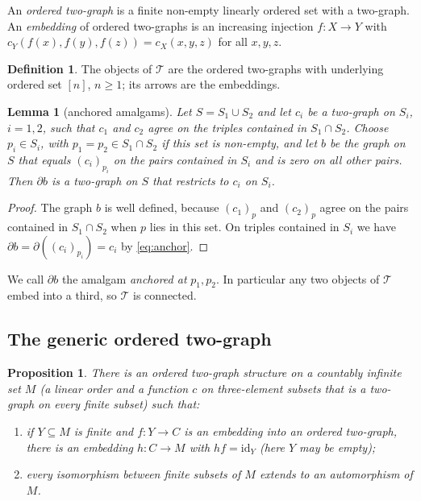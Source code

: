 \documentclass[11pt,a4paper]{article}
\newtheorem{proposition}[theorem]{Proposition}
\newtheorem{lemma}[theorem]{Lemma}
\theoremstyle{definition}
\newtheorem{definition}[theorem]{Definition}
\newcommand{\id}{\mathrm{id}}
\begin{document}
An \emph{ordered two-graph} is a finite non-empty linearly ordered set with a
two-graph. An \emph{embedding} of ordered two-graphs is an increasing
injection $f\colon X\to Y$ with $c_Y(f(x),f(y),f(z))=c_X(x,y,z)$ for all
$x,y,z$.

\begin{definition}
The objects of $\mathcal T$ are the ordered two-graphs with underlying ordered
set $[n]$, $n\ge1$; its arrows are the embeddings.
\end{definition}

\begin{lemma}[anchored amalgams]\label{lem:anchored}
Let $S=S_1\cup S_2$ and let $c_i$ be a two-graph on $S_i$, $i=1,2$, such that
$c_1$ and $c_2$ agree on the triples contained in $S_1\cap S_2$. Choose
$p_i\in S_i$, with $p_1=p_2\in S_1\cap S_2$ if this set is non-empty, and let
$b$ be the graph on $S$ that equals $(c_i)_{p_i}$ on the pairs contained in
$S_i$ and is zero on all other pairs. Then $\partial b$ is a two-graph on $S$
that restricts to $c_i$ on $S_i$.
\end{lemma}

\begin{proof}
The graph $b$ is well defined, because $(c_1)_p$ and $(c_2)_p$ agree on the
pairs contained in $S_1\cap S_2$ when $p$ lies in this set. On triples
contained in $S_i$ we have $\partial b=\partial((c_i)_{p_i})=c_i$ by
\eqref{eq:anchor}.
\end{proof}

We call $\partial b$ the amalgam \emph{anchored at} $p_1,p_2$. In particular
any two objects of $\mathcal T$ embed into a third, so $\mathcal T$ is
connected.

\subsection{The generic ordered two-graph}

\begin{proposition}\label{prop:generic2}
There is an ordered two-graph structure on a countably infinite set $M$
\textup{(}a linear order and a function $c$ on three-element subsets that is a
two-graph on every finite subset\textup{)} such that:
\begin{enumerate}
\item[\textup{(N2)}] if $Y\subseteq M$ is finite and $f\colon Y\to C$ is an
 embedding into an ordered two-graph, there is an embedding $h\colon C\to M$
 with $hf=\id_Y$ \textup{(}here $Y$ may be empty\textup{)};
\item[\textup{(N3)}] every isomorphism between finite subsets of $M$ extends to an
 automorphism of $M$.
\end{enumerate}
\end{proposition}
\end{document}
